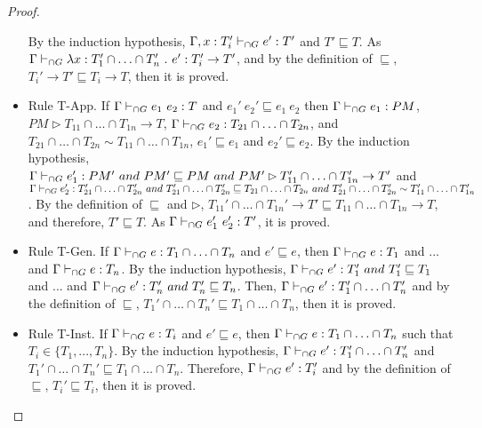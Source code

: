 \documentclass[a4paper]{article}
\begin{document}
\begin{proof}
\begin{itemize}
    By the induction hypothesis, $\Gamma, x : T_i' \vdash_{\cap G} e' : T'$ and $T' \sqsubseteq T$.
    As $\Gamma \vdash_{\cap G} \lambda x : T_1' \cap \ldots \cap T_n'\ .\ e' : T_i' \rightarrow T'$, and by the definition of $\sqsubseteq$, $T_i' \rightarrow T' \sqsubseteq T_i \rightarrow T$, then it is proved.
    \item Rule T-App.
    If $\Gamma \vdash_{\cap G} e_1\ e_2 : T$ and $e_1'\ e_2' \sqsubseteq e_1\ e_2$ then $\Gamma \vdash_{\cap G} e_1 : PM$, $PM \rhd T_{11} \cap \ldots \cap T_{1n} \rightarrow T$, $\Gamma \vdash_{\cap G} e_2 : T_{21} \cap \ldots \cap T_{2n}$, and $T_{21} \cap \ldots \cap T_{2n} \sim T_{11} \cap \ldots \cap T_{1n}$, $e_1' \sqsubseteq e_1$ and $e_2' \sqsubseteq e_2$.
    By the induction hypothesis, $\Gamma \vdash_{\cap G} e_1' : PM'\ and\ PM' \sqsubseteq PM\ and\ PM' \rhd T_{11}' \cap \ldots \cap T_{1n}' \rightarrow T'$ and $\Gamma \vdash_{\cap G} e_2' : T_{21}' \cap \ldots \cap T_{2n}'\ and\ T_{21}' \cap \ldots \cap T_{2n}' \sqsubseteq T_{21} \cap \ldots \cap T_{2n}\ and\ T_{21}' \cap \ldots \cap T_{2n}' \sim T_{11}' \cap \ldots \cap T_{1n}'$.
    By the definition of $\sqsubseteq$ and $\rhd$, $T_{11}' \cap \ldots \cap T_{1n}' \rightarrow T' \sqsubseteq T_{11} \cap \ldots \cap T_{1n} \rightarrow T$, and therefore, $T' \sqsubseteq T$.
    As $\Gamma \vdash_{\cap G} e_1'\ e_2' : T'$, it is proved.
    \item Rule T-Gen.
    If $\Gamma \vdash_{\cap G} e : T_1 \cap \ldots \cap T_n$ and $e' \sqsubseteq e$, then $\Gamma \vdash_{\cap G} e : T_1$ and ... and $\Gamma \vdash_{\cap G} e : T_n$.
    By the induction hypothesis, $\Gamma \gits e' : T_1'\ and\ T_1' \sqsubseteq T_1$ and ... and $\Gamma \vdash_{\cap G} e' : T_n'\ and\ T_n' \sqsubseteq T_n$.
    Then, $\Gamma \vdash_{\cap G} e' : T_1' \cap \ldots \cap T_n'$ and by the definition of $\sqsubseteq$, $T_1' \cap \ldots \cap T_n' \sqsubseteq T_1 \cap \ldots \cap T_n$, then it is proved.
    \item Rule T-Inst.
    If $\Gamma \vdash_{\cap G} e : T_i$ and $e' \sqsubseteq e$, then $\Gamma \vdash_{\cap G} e : T_1 \cap \ldots \cap T_n$ such that $T_i \in \{T_1, ..., T_n\}$.
    By the induction hypothesis, $\Gamma \vdash_{\cap G} e' : T_1' \cap \ldots \cap T_n'$ and $T_1' \cap \ldots \cap T_n' \sqsubseteq T_1 \cap \ldots \cap T_n$.
    Therefore, $\Gamma \vdash_{\cap G} e' : T_i'$ and by the definition of $\sqsubseteq$, $T_i' \sqsubseteq T_i$, then it is proved.
\end{itemize}
\end{proof}
\end{document}
